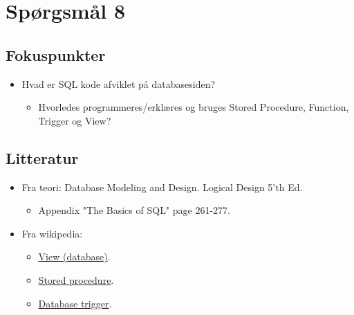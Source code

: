 \section{Spørgsmål 8}


\subsection{Fokuspunkter}
\begin{itemize}
	\item Hvad er SQL kode afviklet på databasesiden?
	\begin{itemize}
		\item Hvorledes programmeres/erklæres og bruges Stored Procedure, Function, Trigger og View?
	\end{itemize}
\end{itemize}

\subsection{Litteratur}
\begin{itemize}
	
	\item Fra teori: Database Modeling and Design. Logical Design 5'th Ed.
	\begin{itemize}
		\item Appendix "The Basics of SQL" page 261-277.
	\end{itemize}
	
	
	\item Fra wikipedia:
	\begin{itemize}
		\item \href{https://en.wikipedia.org/wiki/View_(SQL)}{View (database)}.
		\item \href{https://en.wikipedia.org/wiki/Stored_procedure}{Stored procedure}.
		\item \href{https://en.wikipedia.org/wiki/Database_trigger}{Database trigger}.
	\end{itemize}
	
\end{itemize}


